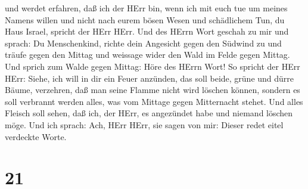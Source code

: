  und werdet erfahren, daß ich der HErr bin, wenn ich mit
euch tue um meines Namens willen und nicht nach eurem bösen Wesen und
schädlichem Tun, du Haus Israel, spricht der HErr HErr. 
Und des HErrn Wort geschah zu mir und sprach:  Du
Menschenkind, richte dein Angesicht gegen den Südwind zu und träufe
gegen den Mittag und weissage wider den Wald im Felde gegen Mittag.
 Und sprich zum Walde gegen Mittag: Höre des HErrn Wort! So
spricht der HErr HErr: Siehe, ich will in dir ein Feuer anzünden, das
soll beide, grüne und dürre Bäume, verzehren, daß man seine Flamme nicht
wird löschen können, sondern es soll verbrannt werden alles, was vom
Mittage gegen Mitternacht stehet.  Und alles Fleisch soll
sehen, daß ich, der HErr, es angezündet habe und niemand löschen möge.
 Und ich sprach: Ach, HErr HErr, sie sagen von mir: Dieser
redet eitel verdeckte Worte.

\hypertarget{section-20}{%
\section{21}\label{section-20}}

